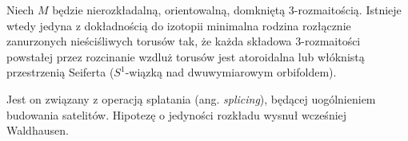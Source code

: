 \begin{proposition}
    Niech $M$ będzie nierozkładalną, orientowalną, domkniętą 3-rozmaitością.
    Istnieje wtedy jedyna z dokładnością do izotopii minimalna rodzina rozłącznie zanurzonych nieściśliwych torusów tak, że każda składowa 3-rozmaitości powstałej przez rozcinanie wzdluż torusów jest atoroidalna lub włóknistą przestrzenią Seiferta ($S^1$-wiązką nad dwuwymiarowym orbifoldem).
\end{proposition}

Jest on związany z operacją splatania (ang. \emph{splicing}), będącej uogólnieniem budowania satelitów.
Hipotezę o jedyności rozkładu wysnuł wcześniej Waldhausen.



